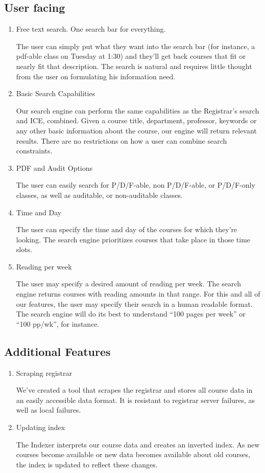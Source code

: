 \documentclass[12pt,letterpaper]{article}
\begin{document}
\subsection{User facing}
\begin{enumerate}
\item Free text search. One search bar for everything.
  
  The user can simply put what they want into the search bar (for instance, a pdf-able class on Tuesday at 1:30) and they'll get back courses that fit or nearly fit that description. The search is natural and requires little thought from the user on formulating his information need. 
  
\item Basic Search Capabilities
  
  Our search engine can perform the same capabilities as the Registrar's search and ICE, combined. Given a course title, department, professor, keywords or any other basic information about the course, our engine will return relevant results. There are no restrictions on how a user can combine search constraints.
  
\item PDF and Audit Options
  
  The user can easily search for P/D/F-able, non P/D/F-able, or P/D/F-only classes, as well as auditable, or non-auditable classes.
  
\item Time and Day
			  
  The user can specify the time and day of the courses for which they're looking. The search engine prioritizes courses that take place in those time slots.
  
\item Reading per week
  
  The user may specify a desired amount of reading per week. The search engine returns courses with reading amounts in that range. For this and all of our features, the user may specify their search in a human readable format. The search engine will do its best to understand ``100 pages per week'' or ``100 pp/wk'', for instance.
  
\end{enumerate}

\subsection{Additional Features}
\begin{enumerate}
\item Scraping registrar
  
  We've created a tool that scrapes the registrar and stores all course data in an easily accessible data format. It is resistant to registrar server failures, as well as local failures.
			
\item Updating index
  
  The Indexer interprets our course data and creates an inverted index. As new courses become available or new data becomes available about old courses, the index is updated to reflect these changes.
  
\end{enumerate}
\end{document}
